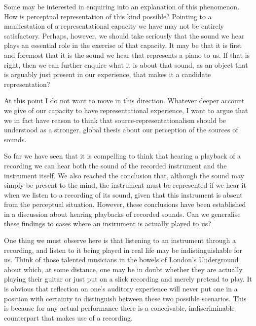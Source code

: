 \documentclass[sloppy, journal, git, bytitle, dodraft]{humapap}
\begin{document}
Some may be interested in enquiring into an explanation of this phenomenon. How is perceptual representation of this kind possible? Pointing to a manifestation of a representational capacity we have may not be entirely satisfactory. Perhaps, however, we should take seriously that the sound we hear plays an essential role in the exercise of that capacity. It may be that it is first and foremost that it is the sound we hear that represents a piano to us. If that is right, then we can further enquire what it is about that sound, as an object that is arguably just present in our experience, that makes it a candidate representation? 

At this point I do not want to move in this direction. Whatever deeper account we give of our capacity to have representational experience, I want to argue that we in fact have reason to think that source-representationalism should be understood as a stronger, global thesis about our perception of the sources of sounds. 


\sect So far we have seen that it is compelling to think that hearing a playback of a recording we can hear both the sound of the recorded instrument and the instrument itself. We also reached the conclusion that, although the sound may simply be present to the mind, the instrument must be represented if we hear it when we listen to a recording of its sound, given that this instrument is absent from the perceptual situation. However, these conclusions have been established in a discussion about hearing playbacks of recorded sounds. Can we generalise these findings to cases where an instrument is actually played to us? 

One thing we must observe here is that listening to an instrument through a recording, and listen to it being played in real life may be indistinguishable for us. Think of those talented musicians in the bowels of London's Underground about which, at some distance, one may be in doubt whether they are actually playing their guitar or just put on a slick recording and merely pretend to play. It is obvious that reflection on one's auditory experience will never put one in a position with certainty to distinguish between these two possible scenarios. This is because for any actual performance there is a conceivable, indiscriminable counterpart that makes use of a recording. 
\end{document}
